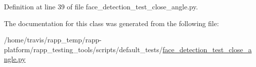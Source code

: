Definition at line 39 of file face\-\_\-detection\-\_\-test\-\_\-close\-\_\-angle.\-py.



The documentation for this class was generated from the following file\-:\begin{DoxyCompactItemize}
\item 
/home/travis/rapp\-\_\-temp/rapp-\/platform/rapp\-\_\-testing\-\_\-tools/scripts/default\-\_\-tests/\hyperlink{face__detection__test__close__angle_8py}{face\-\_\-detection\-\_\-test\-\_\-close\-\_\-angle.\-py}\end{DoxyCompactItemize}
